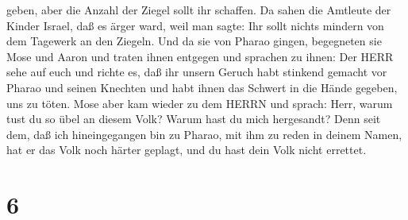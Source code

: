 geben, aber die Anzahl der Ziegel sollt ihr schaffen.  Da
sahen die Amtleute der Kinder Israel, daß es ärger ward, weil man sagte:
Ihr sollt nichts mindern von dem Tagewerk an den Ziegeln. 
Und da sie von Pharao gingen, begegneten sie Mose und Aaron und traten
ihnen entgegen  und sprachen zu ihnen: Der HERR sehe auf
euch und richte es, daß ihr unsern Geruch habt stinkend gemacht vor
Pharao und seinen Knechten und habt ihnen das Schwert in die Hände
gegeben, uns zu töten.  Mose aber kam wieder zu dem HERRN
und sprach: Herr, warum tust du so übel an diesem Volk? Warum hast du
mich hergesandt?  Denn seit dem, daß ich hineingegangen bin
zu Pharao, mit ihm zu reden in deinem Namen, hat er das Volk noch härter
geplagt, und du hast dein Volk nicht errettet.

\hypertarget{section-5}{%
\section{6}\label{section-5}}

